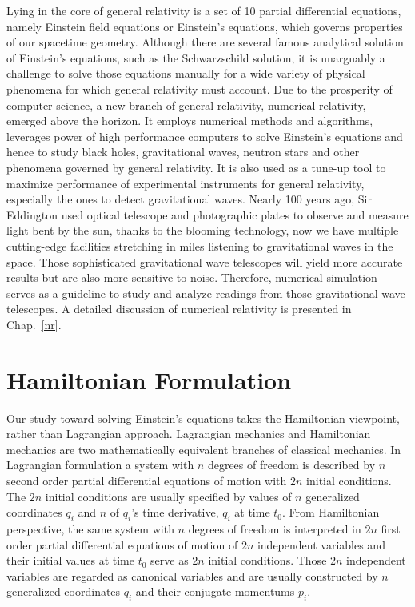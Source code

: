Lying in the core of general relativity is a set of 10 partial differential equations, namely Einstein field equations or Einstein's equations, which governs properties of our spacetime geometry. Although there are several famous analytical solution of Einstein's equations, such as the Schwarzschild solution, it is unarguably a challenge to solve those equations manually for a wide variety of physical phenomena for which general relativity must account. Due to the prosperity of computer science, a new branch of general relativity, numerical relativity, emerged above the horizon. It employs numerical methods and algorithms, leverages power of high performance computers to solve Einstein's equations and hence to study black holes, gravitational waves, neutron stars and other phenomena governed by general relativity. It is also used as a tune-up tool to maximize performance of experimental instruments for general relativity, especially the ones to detect gravitational waves. Nearly 100 years ago, Sir Eddington used optical telescope and photographic plates to observe and measure light bent by the sun, thanks to the blooming technology, now we have multiple cutting-edge facilities stretching in miles listening to gravitational waves in the space. Those sophisticated gravitational wave telescopes will yield more accurate results but are also more sensitive to noise. Therefore, numerical simulation serves as a guideline to study and analyze readings from those gravitational wave telescopes. A detailed discussion of numerical relativity is presented in Chap.~\ref{nr}. 
\section{Hamiltonian Formulation}\label{ham}
Our study toward solving Einstein's equations takes the Hamiltonian viewpoint, rather than Lagrangian approach. Lagrangian mechanics and Hamiltonian mechanics are two mathematically equivalent branches of classical mechanics. In Lagrangian formulation a system with $n$ degrees of freedom is described by $n$ second order partial differential equations of motion with $2n$ initial conditions. The $2n$ initial conditions are usually specified by values of $n$ generalized coordinates $q_{i}$ and $n$ of $q_{i}$'s time derivative, ${\dot q}_{i}$ at time $t_{0}$. From Hamiltonian perspective, the same system with $n$ degrees of freedom is interpreted in $2n$ first order partial differential equations of motion of $2n$ independent variables and their initial values at time $t_{0}$ serve as $2n$ initial conditions. Those $2n$ independent variables are regarded as canonical variables and are usually constructed by $n$ generalized coordinates $q_{i}$ and their conjugate momentums $p_{i}$.

